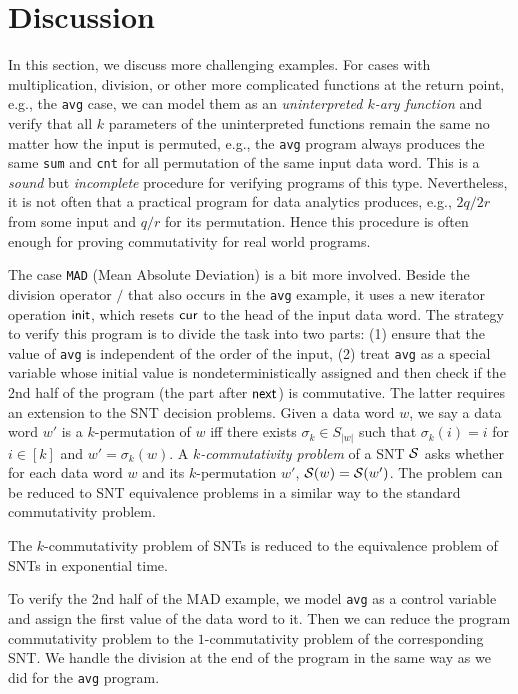 \section{Discussion}
\label{sec:cases}



In this section, we discuss more challenging examples. 
For cases with multiplication, division, or other more complicated functions at the return point, e.g., the \texttt{avg} case, we can model them as an \emph{uninterpreted $k$-ary function} and verify that all $k$ parameters of the uninterpreted functions remain the same no matter how the input is permuted, e.g., the \texttt{avg} program always produces the same \texttt{sum} and \texttt{cnt} for all permutation of the same input data word. This is a \emph{sound} but \emph{incomplete} procedure for verifying programs of this type. Nevertheless, it is not often that a  practical program for data analytics produces, e.g., $2q/2r$ from some input and $q/r$ for its permutation. Hence this procedure is often enough for proving commutativity for real world programs.

The case \texttt{MAD} (Mean Absolute Deviation) is a bit more involved. Beside the division operator $/$ that also occurs in the \texttt{avg} example, it uses a new iterator operation $\mathsf{init}$, which resets $\mathsf{cur}$ to the head of the input data word. The strategy to verify this program is to divide the task into two parts: (1) ensure that the value of \texttt{avg} is independent of the order of the input, (2) treat \texttt{avg} as a special variable whose initial value is nondeterministically assigned and then check if the 2nd half of the program (the part after $\mathsf{next}$) is commutative. The latter requires an extension to the SNT decision problems. Given a data word $w$, we say a data word $w'$ is a $k$-permutation of $w$ iff there exists $\sigma_k\in S_{|w|}$ such that $\sigma_k(i)=i$ for $i \in [k]$ and $w'=\sigma_k(w)$. A \emph{$k$-commutativity problem} of a SNT ${\mathcal{S} }$ asks whether for each data word $w$ and its $k$-permutation $w'$, ${\mathcal{S} }(w)={\mathcal{S} }(w')$. The problem can be reduced to SNT equivalence problems in a similar way to the standard commutativity problem.

\begin{proposition}\label{prop-snt-kcmm-to-eqv}
	The $k$-commutativity problem of SNTs is reduced to the equivalence problem of SNTs in exponential time. 
\end{proposition}

To verify the 2nd half of the MAD example, we model \texttt{avg} as a control variable and assign the first value of the data word to it. Then we can reduce the program commutativity problem to the $1$-commutativity problem of the corresponding SNT. We handle the division at the end of the program in the same way as we did for the \texttt{avg} program.

